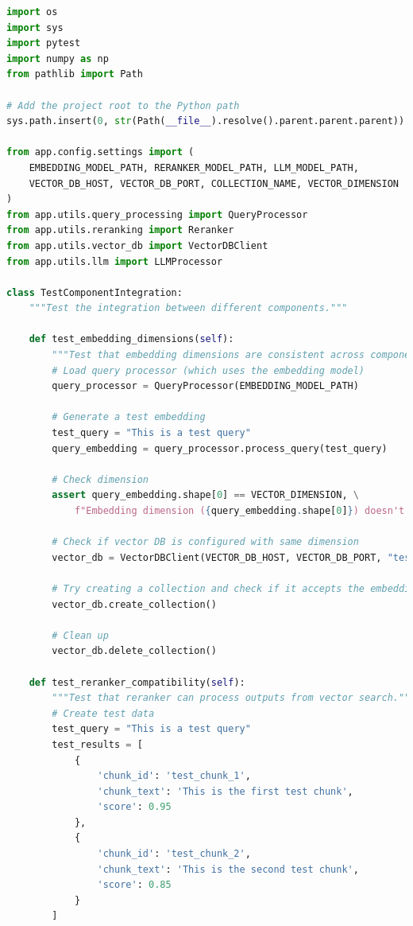 \documentclass[
  screen,review,acmlarge]{acmart}
\begin{document}
\begin{lstlisting}[language=Python]
import os
import sys
import pytest
import numpy as np
from pathlib import Path

# Add the project root to the Python path
sys.path.insert(0, str(Path(__file__).resolve().parent.parent.parent))

from app.config.settings import (
    EMBEDDING_MODEL_PATH, RERANKER_MODEL_PATH, LLM_MODEL_PATH,
    VECTOR_DB_HOST, VECTOR_DB_PORT, COLLECTION_NAME, VECTOR_DIMENSION
)
from app.utils.query_processing import QueryProcessor
from app.utils.reranking import Reranker
from app.utils.vector_db import VectorDBClient
from app.utils.llm import LLMProcessor

class TestComponentIntegration:
    """Test the integration between different components."""
    
    def test_embedding_dimensions(self):
        """Test that embedding dimensions are consistent across components."""
        # Load query processor (which uses the embedding model)
        query_processor = QueryProcessor(EMBEDDING_MODEL_PATH)
        
        # Generate a test embedding
        test_query = "This is a test query"
        query_embedding = query_processor.process_query(test_query)
        
        # Check dimension
        assert query_embedding.shape[0] == VECTOR_DIMENSION, \
            f"Embedding dimension ({query_embedding.shape[0]}) doesn't match configured dimension ({VECTOR_DIMENSION})"
        
        # Check if vector DB is configured with same dimension
        vector_db = VectorDBClient(VECTOR_DB_HOST, VECTOR_DB_PORT, "test_consistency", VECTOR_DIMENSION)
        
        # Try creating a collection and check if it accepts the embedding
        vector_db.create_collection()
        
        # Clean up
        vector_db.delete_collection()
    
    def test_reranker_compatibility(self):
        """Test that reranker can process outputs from vector search."""
        # Create test data
        test_query = "This is a test query"
        test_results = [
            {
                'chunk_id': 'test_chunk_1',
                'chunk_text': 'This is the first test chunk',
                'score': 0.95
            },
            {
                'chunk_id': 'test_chunk_2',
                'chunk_text': 'This is the second test chunk',
                'score': 0.85
            }
        ]
        

\end{lstlisting}
\end{document}
